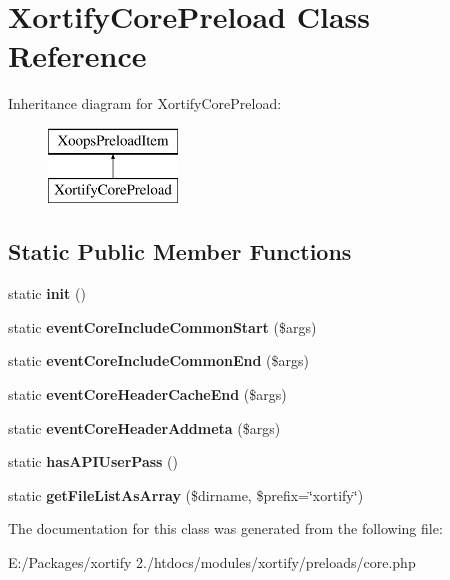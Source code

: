 \hypertarget{class_xortify_core_preload}{\section{Xortify\-Core\-Preload Class Reference}
\label{class_xortify_core_preload}
}
Inheritance diagram for Xortify\-Core\-Preload\-:\begin{figure}[H]
\begin{center}
\leavevmode
\includegraphics[height=2.000000cm]{class_xortify_core_preload}
\end{center}
\end{figure}
\subsection*{Static Public Member Functions}
\begin{DoxyCompactItemize}
\item 
\hypertarget{class_xortify_core_preload_a49b2f366deb184c64dafc52a545cd0ba}{static {\bfseries init} ()}\label{class_xortify_core_preload_a49b2f366deb184c64dafc52a545cd0ba}

\item 
\hypertarget{class_xortify_core_preload_ad4b9c195c5ecd7ffb16a5633e4b5d629}{static {\bfseries event\-Core\-Include\-Common\-Start} (\$args)}\label{class_xortify_core_preload_ad4b9c195c5ecd7ffb16a5633e4b5d629}

\item 
\hypertarget{class_xortify_core_preload_a3798c467e2eb79e2d92d05a95a4cddb4}{static {\bfseries event\-Core\-Include\-Common\-End} (\$args)}\label{class_xortify_core_preload_a3798c467e2eb79e2d92d05a95a4cddb4}

\item 
\hypertarget{class_xortify_core_preload_a2db362aebbdaf2bd05bfbd921bea6709}{static {\bfseries event\-Core\-Header\-Cache\-End} (\$args)}\label{class_xortify_core_preload_a2db362aebbdaf2bd05bfbd921bea6709}

\item 
\hypertarget{class_xortify_core_preload_a1d454c8d2786d5edfb08cf692d52cc15}{static {\bfseries event\-Core\-Header\-Addmeta} (\$args)}\label{class_xortify_core_preload_a1d454c8d2786d5edfb08cf692d52cc15}

\item 
\hypertarget{class_xortify_core_preload_aeafc66232e17b00ccb497a7b06cff12e}{static {\bfseries has\-A\-P\-I\-User\-Pass} ()}\label{class_xortify_core_preload_aeafc66232e17b00ccb497a7b06cff12e}

\item 
\hypertarget{class_xortify_core_preload_ae8de979bbe999306b7791066df4f1be5}{static {\bfseries get\-File\-List\-As\-Array} (\$dirname, \$prefix=\char`\"{}xortify\char`\"{})}\label{class_xortify_core_preload_ae8de979bbe999306b7791066df4f1be5}

\end{DoxyCompactItemize}


The documentation for this class was generated from the following file\-:\begin{DoxyCompactItemize}
\item 
E\-:/\-Packages/xortify 2./htdocs/modules/xortify/preloads/core.\-php\end{DoxyCompactItemize}
